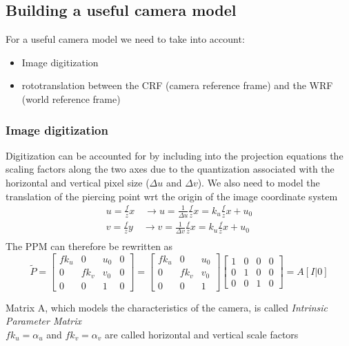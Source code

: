 \documentclass{article}
\begin{document}
\subsection{Building a useful camera model}
For a useful camera model we need to take into account:
\begin{itemize}
    \item Image digitization
    \item rototranslation between the CRF (camera reference frame) and the WRF (world reference frame)
\end{itemize}
\subsubsection{Image digitization}
Digitization can be accounted for by including into the projection equations the scaling factors along the two axes due to the quantization associated with the horizontal and vertical pixel size ($\Delta u$ and $\Delta v$). We also need to model the translation of the piercing point wrt the origin of the image coordinate system
\begin{gather*}
    u=\frac{f}{z}x \quad \rightarrow u = \frac{1}{\Delta u} \frac{f}{z}x=k_u\frac{f}{z}x+u_0 \\
    v=\frac{f}{z}y \quad \rightarrow v = \frac{1}{\Delta v} \frac{f}{z}x=k_u\frac{f}{z}x+u_0 \\
\end{gather*}
The PPM can therefore be rewritten as
\begin{equation}
    \tilde{P}=\begin{bmatrix}
        fk_u & 0 & u_0 & 0 \\
        0 & fk_v & v_0 & 0 \\
        0 & 0 & 1 & 0
    \end{bmatrix}=\begin{bmatrix}
        fk_u & 0 & u_0 \\
        0 & fk_v & v_0 \\
        0 & 0 & 1
    \end{bmatrix} \begin{bmatrix}
        1 & 0 & 0 & 0 \\
        0 & 1 & 0 & 0 \\
        0 & 0 & 1 & 0 
    \end{bmatrix} = A[I|0]
\end{equation}

Matrix A, which models the characteristics of the camera, is called \emph{Intrinsic Parameter Matrix}\\
$fk_u=\alpha_u$ and $fk_v=\alpha_v$ are called horizontal and vertical scale factors
\end{document}
